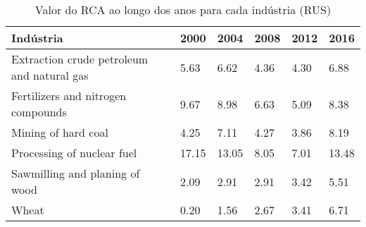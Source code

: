 \begin{table}
\centering
\caption{Valor do RCA ao longo dos anos para cada indústria (RUS)}
\label{tab:ex3-tempo-RUS}
\begin{tabular}{p{6cm}p{1.5cm}p{1.5cm}p{1.5cm}p{1.5cm}p{1.5cm}}
\toprule
                                 Indústria &  2000 &  2004 & 2008 & 2012 &  2016 \\
\midrule
Extraction crude petroleum and natural gas &  5.63 &  6.62 & 4.36 & 4.30 &  6.88 \\
        Fertilizers and nitrogen compounds &  9.67 &  8.98 & 6.63 & 5.09 &  8.38 \\
                       Mining of hard coal &  4.25 &  7.11 & 4.27 & 3.86 &  8.19 \\
                Processing of nuclear fuel & 17.15 & 13.05 & 8.05 & 7.01 & 13.48 \\
            Sawmilling and planing of wood &  2.09 &  2.91 & 2.91 & 3.42 &  5.51 \\
                                     Wheat &  0.20 &  1.56 & 2.67 & 3.41 &  6.71 \\
\bottomrule
\end{tabular}
\end{table}
